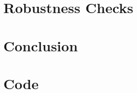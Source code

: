 \documentclass[12pt,oneside,reqno]{amsart}
\begin{document}
\section{Robustness Checks}
\label{Robustness}

\section{Conclusion}
\label{Conclusion}

{}


\section{Code}

\end{document}
